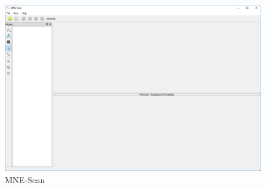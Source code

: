 \begin{figure}
	
	\begin{center}
		
		\includegraphics[scale=0.3]{Figures/MNE-Scan.PNG}
	
	\end{center}
	
	\caption{MNE-Scan}

\end{figure}

